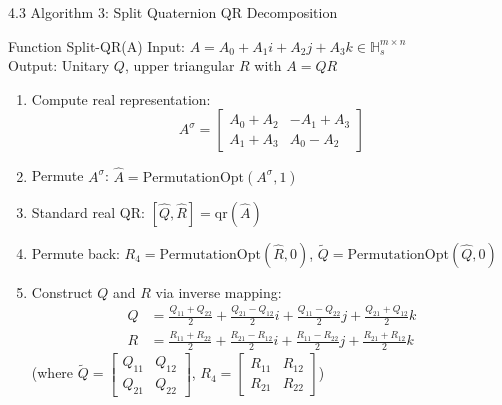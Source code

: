 \documentclass{beamer}
\begin{document}
\begin{frame}{4.3 Algorithm 3: Split Quaternion QR Decomposition}
  \begin{block}{Function Split-QR(A)}
    Input: $A = A_0 + A_1i + A_2j + A_3k \in \mathbb{H}_s^{m \times n}$ \\
    Output: Unitary $Q$, upper triangular $R$ with $A=QR$
    \begin{enumerate}
      \item Compute real representation:
        \[
        A^\sigma = \begin{bmatrix} A_0+A_2 & -A_1+A_3 \\ A_1+A_3 & A_0-A_2 \end{bmatrix}
        \]
      \item Permute $A^\sigma$: $\hat{A} = \text{PermutationOpt}(A^\sigma, 1)$
      \item Standard real QR: $[\hat{Q}, \hat{R}] = \text{qr}(\hat{A})$
      \item Permute back: $R_4 = \text{PermutationOpt}(\hat{R}, 0)$, $\tilde{Q} = \text{PermutationOpt}(\hat{Q}, 0)$
      \item Construct $Q$ and $R$ via inverse mapping:
        \begin{align*}
        Q &= \frac{Q_{11}+Q_{22}}{2} + \frac{Q_{21}-Q_{12}}{2}i + \frac{Q_{11}-Q_{22}}{2}j + \frac{Q_{21}+Q_{12}}{2}k \\
        R &= \frac{R_{11}+R_{22}}{2} + \frac{R_{21}-R_{12}}{2}i + \frac{R_{11}-R_{22}}{2}j + \frac{R_{21}+R_{12}}{2}k
        \end{align*}
        (where $\tilde{Q} = \begin{bmatrix} Q_{11} & Q_{12} \\ Q_{21} & Q_{22} \end{bmatrix}$, $R_4 = \begin{bmatrix} R_{11} & R_{12} \\ R_{21} & R_{22} \end{bmatrix}$)
    \end{enumerate}
  \end{block}
\end{frame}
\end{document}
